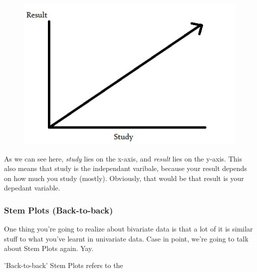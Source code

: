 \documentclass[11pt]{article}
\begin{document}
\clearpage{}
\begin{figure}[htp]
\centering
\includegraphics[scale=0.80]{BiVariableImage11.jpg}
\end{figure}

As we can see here, \emph{study} lies on the x-axis, and \emph{result} lies on the y-axis. This also means that study is the independant varibale, because your result depends on how much you study (mostly). Obviously, that would be that result is your depedant variable. 

\subsubsection*{Stem Plots (Back-to-back)}

One thing you're going to realize about bivariate data is that a lot of it is similar stuff to what you've learnt in univariate data. Case in point, we're going to talk about Stem Plots again. Yay.

'Back-to-back' Stem Plots refers to the
\end{document}
